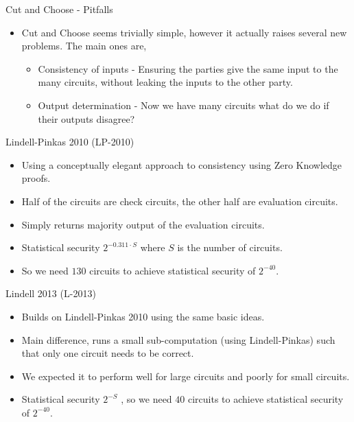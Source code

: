 \documentclass[t, 12pt]{beamer}            %
\begin{document}
\begin{frame}{Cut and Choose - Pitfalls}
	\begin{itemize} %
		\item Cut and Choose seems trivially simple, however it actually raises several new problems. The main ones are,
		\begin{itemize}
			\item Consistency of inputs - Ensuring the parties give the same input to the many circuits, without leaking the inputs to the other party.
			\item Output determination - Now we have many circuits what do we do if their outputs disagree?
		\end{itemize}
	\end{itemize}

\end{frame}


\begin{frame}{Lindell-Pinkas 2010 (LP-2010)}
	\begin{itemize} %
		\item Using a conceptually elegant approach to consistency using Zero Knowledge proofs.
		\item Half of the circuits are check circuits, the other half are evaluation circuits.
		\item Simply returns majority output of the evaluation circuits.
		\item Statistical security $2^{-0.311 \cdot S}$  where $S$ is the number of circuits.
		\item So we need $130$ circuits to achieve statistical security of $2^{-40}$.
	\end{itemize}

\end{frame}


\begin{frame}{Lindell 2013 (L-2013)}
	\begin{itemize} %
		\item Builds on Lindell-Pinkas 2010 using the same basic ideas.  %
		\item Main difference, runs a small sub-computation (using Lindell-Pinkas) such that only one circuit needs to be correct.
		\item We expected it to perform well for large circuits and poorly for small circuits.
		\item Statistical security $2^{-S}$ , so we need $40$ circuits to achieve statistical security of $2^{-40}$.
	\end{itemize}

\end{frame}
\end{document}

